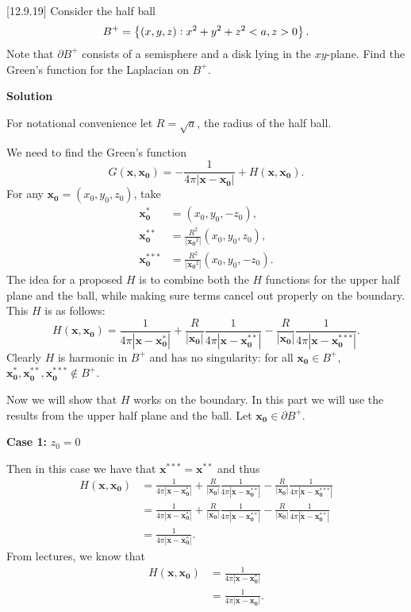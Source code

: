 \documentclass{article}
\def\*#1{\mathbf{#1}}
\begin{document}
[12.9.19] Consider the half ball
%
\begin{equation*}
    B^+ = \cbr[1]{(x, y, z): x^2 + y^2 + z^2 < a, z > 0}
    .
\end{equation*}
%
Note that $\partial B^+$ consists of a semisphere and a disk lying in
the $x y$-plane. Find the Green's function for the Laplacian on $B^+$.

\textbf{Solution}

For notational convenience let $R = \sqrt{a}$, the radius of the half
ball.

We need to find the Green's function
%
\begin{equation*}
    G(\*x, \*{x_0}) = - \frac{1}{4 \pi |\*x - \*{x_0}|} + H(\*x, \*{x_0})
    .
\end{equation*}
%
For any $\*{x_0} = (x_0, y_0, z_0)$, take
%
\begin{align*}
    \*{x_0^{*}} &= (x_0, y_0, -z_0), \\
    \*{x_0^{**}} &= \frac{R^2}{|\*{x_0}^2|} (x_0, y_0, z_0), \\
    \*{x_0^{***}} &= \frac{R^2}{|\*{x_0}^2|} (x_0, y_0, -z_0)
    .
\end{align*}
%
The idea for a proposed $H$ is to combine both the $H$ functions for the
upper half plane and the ball, while making sure terms cancel out
properly on the boundary. This $H$ is as follows:
%
\begin{equation*}
    H(\*{x}, \*{x_0}) =
        \frac{1}{4 \pi |\*x - \*{x_0^*}|}
        + \frac{R}{|\*{x_0}|} \frac{1}{4 \pi |\*x - \*{x_0^{**}}|}
        - \frac{R}{|\*{x_0}|} \frac{1}{4 \pi |\*x - \*{x_0^{***}}|}
    .
\end{equation*}
%
Clearly $H$ is harmonic in $B^+$ and has no singularity: for all
$\*{x_0} \in B^+$, $\*{x_0^*}, \*{x_0^{**}}, \*{x_0^{***}} \notin B^+$.

Now we will show that $H$ works on the boundary. In this part we will
use the results from the upper half plane and the ball. Let $\*{x_0} \in
\partial B^+$.

\textbf{Case 1:} $z_0 = 0$

Then in this case we have that $\*{x^{***}} = \*{x^{**}}$ and thus
%
\begin{align*}
    H(\*{x}, \*{x_0}) &=
        \frac{1}{4 \pi |\*x - \*{x_0^*}|}
        + \frac{R}{|\*{x_0}|} \frac{1}{4 \pi |\*x - \*{x_0^{**}}|}
        - \frac{R}{|\*{x_0}|} \frac{1}{4 \pi |\*x - \*{x_0^{***}}|} \\
    &=
        \frac{1}{4 \pi |\*x - \*{x_0^*}|}
        + \frac{R}{|\*{x_0}|} \frac{1}{4 \pi |\*x - \*{x_0^{**}}|}
        - \frac{R}{|\*{x_0}|} \frac{1}{4 \pi |\*x - \*{x_0^{**}}|} \\
    &=
        \frac{1}{4 \pi |\*x - \*{x_0^*}|}
    .
\end{align*}
%
From lectures, we know that
%
\begin{align*}
    H(\*{x}, \*{x_0})
        &= \frac{1}{4 \pi |\*x - \*{x_0^*}|} \\
        &= \frac{1}{4 \pi |\*x - \*{x_0}|}
    .
\end{align*}
\end{document}
